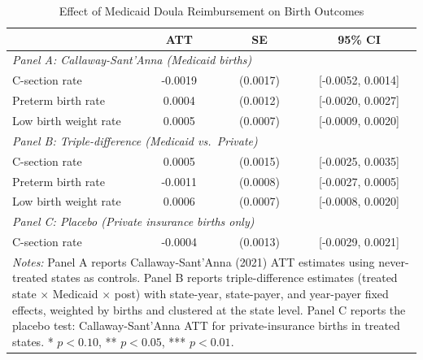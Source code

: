 \begin{table}[t]
\centering
\caption{Effect of Medicaid Doula Reimbursement on Birth Outcomes}
\label{tab:main}
\begin{tabular}{lccc}
\hline\hline
 & ATT & SE & 95\% CI \\
\hline
\multicolumn{4}{l}{\textit{Panel A: Callaway-Sant'Anna (Medicaid births)}} \\
C-section rate & -0.0019 & (0.0017) & [-0.0052, 0.0014] \\
Preterm birth rate & 0.0004 & (0.0012) & [-0.0020, 0.0027] \\
Low birth weight rate & 0.0005 & (0.0007) & [-0.0009, 0.0020] \\
\hline
\multicolumn{4}{l}{\textit{Panel B: Triple-difference (Medicaid vs.\ Private)}} \\
C-section rate & 0.0005 & (0.0015) & [-0.0025, 0.0035] \\
Preterm birth rate & -0.0011 & (0.0008) & [-0.0027, 0.0005] \\
Low birth weight rate & 0.0006 & (0.0007) & [-0.0008, 0.0020] \\
\hline
\multicolumn{4}{l}{\textit{Panel C: Placebo (Private insurance births only)}} \\
C-section rate & -0.0004 & (0.0013) & [-0.0029, 0.0021] \\
\hline\hline
\multicolumn{4}{p{0.85\textwidth}}{\footnotesize \textit{Notes:} Panel A reports Callaway-Sant'Anna (2021) ATT estimates using never-treated states as controls. Panel B reports triple-difference estimates (treated state $\times$ Medicaid $\times$ post) with state-year, state-payer, and year-payer fixed effects, weighted by births and clustered at the state level. Panel C reports the placebo test: Callaway-Sant'Anna ATT for private-insurance births in treated states. * $p<0.10$, ** $p<0.05$, *** $p<0.01$.}
\end{tabular}
\end{table}

